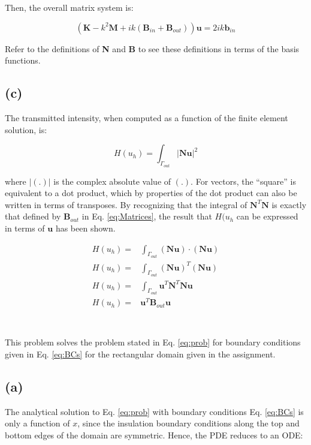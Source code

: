 \documentclass[10pt]{article}
\newcommand{\beq}{\begin{equation}}
\newcommand{\eeq}{\end{equation}}
\newcommand{\beqa}{\begin{equation}\begin{aligned}}
\newcommand{\eeqa}{\end{aligned}\end{equation}}
\begin{document}
Then, the overall matrix system is:

\beq
\left(\textbf{K}-k^2\textbf{M}+ik(\textbf{B}_{in}+\textbf{B}_{out})\right)\textbf{u}=2ik\textbf{b}_{in}
\eeq

Refer to the definitions of \textbf{N} and \textbf{B} to see these definitions in terms of the basis functions.

\subsection{(c)}

The transmitted intensity, when computed as a function of the finite element solution, is:

\beq
H(u_h)=\int_{\Gamma_{out}}|\textbf{N}\textbf{u}|^2
\eeq

where \(|(.)|\) is the complex absolute value of \((.)\). For vectors, the ``square'' is equivalent to a dot product, which by properties of the dot product can also be written in terms of transposes. By recognizing that the integral of \(\textbf{N}^T\textbf{N}\) is exactly that defined by \(\textbf{B}_{out}\) in Eq. \eqref{eq:Matrices}, the result that \(H(u_h\) can be expressed in terms of \(\textbf{u}\) has been shown.

\beqa
H(u_h)=&\int_{\Gamma_{out}}(\textbf{N}\textbf{u})\cdot(\textbf{N}\textbf{u})\\
H(u_h)=&\int_{\Gamma_{out}}(\textbf{N}\textbf{u})^T(\textbf{N}\textbf{u})\\
H(u_h)=&\int_{\Gamma_{out}}\textbf{u}^T\textbf{N}^T\textbf{N}\textbf{u}\\
H(u_h)=&\textbf{u}^T\textbf{B}_{out}\textbf{u}\\
\eeqa

\section{}

This problem solves the problem stated in Eq. \eqref{eq:prob} for boundary conditions given in Eq. \eqref{eq:BCs} for the rectangular domain given in the assignment.

\subsection{(a)}

The analytical solution to Eq. \eqref{eq:prob} with boundary conditions Eq. \eqref{eq:BCs} is only a function of \(x\), since the insulation boundary conditions along the top and bottom edges of the domain are symmetric. Hence, the PDE reduces to an ODE:
\end{document}
